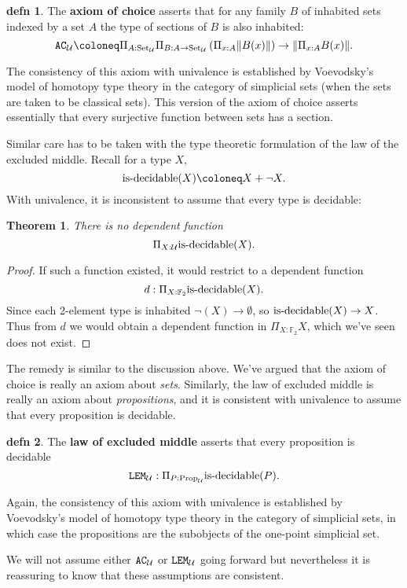 \documentclass{amsart}
\theoremstyle{theorem}
\newtheorem*{thm}{Theorem}
\theoremstyle{definition}
\newtheorem*{defn}{defn}
\theoremstyle{remark}
\newcommand{\0}{\mathbbe{0}}
\newcommand{\1}{\mathbbe{1}}
\newcommand{\2}{\mathbbe{2}}
\newcommand{\3}{\mathbbe{3}}
\newcommand{\4}{\mathbbe{4}}
\newcommand{\FF}{\mathbb{F}}
\newcommand{\term}[1]{{\textup{\texttt{#1}}}}
\newcommand{\type}[1]{{\textup{#1}}}
\newcommand{\UU}{{\mathcal{U}}}
\newcommand{\is}[1]{\type{is-{#1}}}
\newcommand{\Prop}{\type{Prop}_{\UU}}
\newcommand{\Set}{\type{Set}_{\UU}}
\newcommand{\mere}[1]{\|{#1}\|}
\begin{document}
\begin{defn} The \textbf{axiom of choice} asserts that for any family $B$ of inhabited sets indexed by a set $A$ the type of sections of $B$ is also inhabited:
\[ \term{AC}_\UU \coloneq \Pi_{A: \Set}\Pi_{B : A \to \Set} \left( \Pi_{x:A} \mere{B(x)}\right) \to \mere{ \Pi_{x:A} B(x)}.\]
\end{defn}

The consistency of this axiom with univalence is established by Voevodsky's model of homotopy type theory in the category of simplicial sets (when the sets are taken to be classical sets). This version of the axiom of choice asserts essentially that every surjective function between sets has a section.

Similar care has to be taken with the type theoretic formulation of the law of the excluded middle. Recall for a type $X$, 
\[ \is{decidable}(X) \coloneq X + \neg X.\]
With univalence, it is inconsistent to assume that every type is decidable:

\begin{thm} There is no dependent function
\[ \Pi_{X: \UU} \is{decidable}(X).\]
\end{thm}
\begin{proof}
If such a function existed, it would restrict to a dependent function
\[ d : \Pi_{X : \FF_2} \is{decidable}(X).\]
Since each 2-element type is inhabited $\neg (X) \to \emptyset$, so $\is{decidable}(X) \to X$. Thus from $d$ we would obtain a dependent function in $\Pi_{X: \FF_2} X$, which we've seen does not exist.
\end{proof}

The remedy is similar to the discussion above. We've argued that the axiom of choice is really an axiom about \emph{sets}. Similarly, the law of excluded middle is really an axiom about \emph{propositions}, and it is consistent with univalence to assume that every proposition is decidable.

\begin{defn} The \textbf{law of excluded middle} asserts that every proposition is decidable
\[ \term{LEM}_\UU : \Pi_{P :\Prop} \is{decidable}(P).\]
\end{defn}

Again, the consistency of this axiom with univalence is established by Voevodsky's model of homotopy type theory in the category of simplicial sets, in which case the propositions are the subobjects of the one-point simplicial set. 

We will not assume either $\term{AC}_\UU$ or $\term{LEM}_\UU$ going forward but nevertheless it is reassuring to know that these assumptions are consistent.
\end{document}

